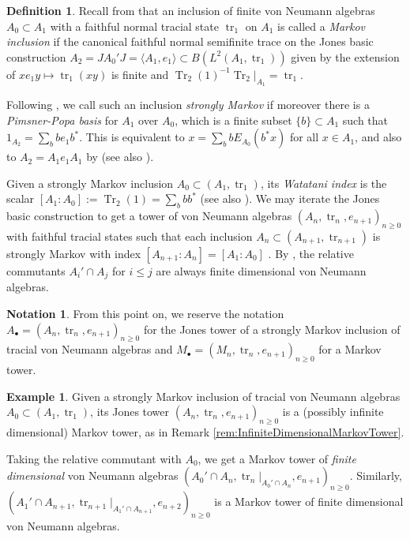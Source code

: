 \documentclass[11pt]{article}
\theoremstyle{plain}
\theoremstyle{definition}
\newtheorem{defn}[thm]{Definition}
\newtheorem{nota}[thm]{Notation}
\newtheorem{ex}[thm]{Example}
\DeclareMathOperator{\Tr}{Tr}
\DeclareMathOperator{\tr}{tr}
\begin{document}
\begin{defn}
\label{def:StronglyMarkovInclusion}
Recall from \cite{MR1278111} that an inclusion of finite von Neumann algebras $A_0\subset A_1$ with a faithful normal tracial state $\tr_1$ on $A_1$ is called a \emph{Markov inclusion} 
if
the canonical faithful normal semifinite trace on the Jones basic construction $A_2 = JA_0'J = \langle A_1, e_1\rangle \subset B(L^2(A_1, \tr_1))$ given by the extension of $xe_1y \mapsto \tr_1(xy)$ is finite and $\Tr_2(1)^{-1}\Tr_2|_{A_1}=\tr_1$.

Following \cite{MR2812459}, we call such an inclusion \emph{strongly Markov} if moreover there is a \emph{Pimsner-Popa basis} for $A_1$ over $A_0$, which is a finite subset $\{b\}\subset A_1$ such that $1_{A_2} = \sum_b b e_1b^*$.
This is equivalent to $x = \sum_b b E_{A_0}(b^*x)$ for all $x\in A_1$, and also to $A_2 = A_1e_1A_1$ by \cite[Prop.~3(b)]{MR561983}
(see also \cite{MR996807}).

Given a strongly Markov inclusion $A_0\subset (A_1, \tr_1)$, 
its \emph{Watatani index} \cite{MR996807} is the scalar $[A_1:A_0]:=\Tr_2(1) = \sum_b bb^* $ (see also \cite[1.1.4(c)]{MR1278111}).
We may iterate the Jones basic construction to get a tower of von Neumann algebras $(A_n ,\tr_n, e_{n+1})_{n\geq 0}$ with faithful tracial states such that each inclusion $A_{n}\subset (A_{n+1}, \tr_{n+1})$ is strongly Markov with index $[A_{n+1}: A_n] = [A_1:A_0]$ \cite{MR2812459}.
By \cite[Prop.~2.7.3]{MR996807}, the relative commutants $A_i' \cap A_j$ for $i\leq j$ are always finite dimensional von Neumann algebras.
\end{defn}

\begin{nota}
From this point on, we reserve the notation $A_\bullet=(A_n,\tr_n, e_{n+1})_{n\geq 0}$ for the Jones tower of a strongly Markov inclusion of tracial von Neumann algebras and $M_\bullet = (M_n, \tr_n, e_{n+1})_{n\geq 0}$ for a Markov tower.
\end{nota}

\begin{ex}
 Given a strongly Markov inclusion of tracial von Neumann algebras $A_0\subset (A_1, \tr_1)$, its Jones tower $(A_n, \tr_n, e_{n+1})_{n\geq 0}$ is a (possibly infinite dimensional) Markov tower, as in Remark \ref{rem:InfiniteDimensionalMarkovTower}.

Taking the relative commutant with $A_0$, we get a Markov tower of \emph{finite dimensional} von Neumann algebras $(A_0'\cap A_n , \tr_n|_{A_0'\cap A_n} , e_{n+1})_{n\geq 0}$.
Similarly, $(A_1'\cap A_{n+1} , \tr_{n+1}|_{A_1'\cap A_{n+1}} , e_{n+2})_{n\geq 0}$ is a Markov tower of finite dimensional von Neumann algebras.
\end{ex}
\end{document}
